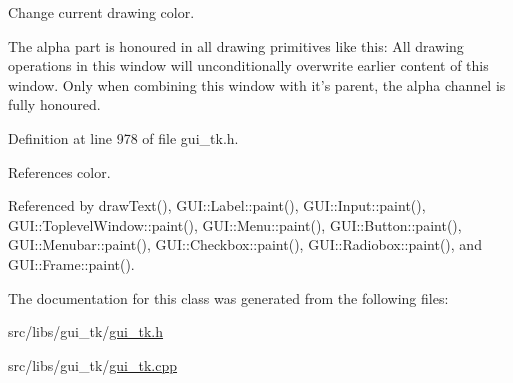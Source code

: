 Change current drawing color. 

The alpha part is honoured in all drawing primitives like this\-: All drawing operations in this window will unconditionally overwrite earlier content of this window. Only when combining this window with it's parent, the alpha channel is fully honoured. 

Definition at line 978 of file gui\-\_\-tk.\-h.



References color.



Referenced by draw\-Text(), G\-U\-I\-::\-Label\-::paint(), G\-U\-I\-::\-Input\-::paint(), G\-U\-I\-::\-Toplevel\-Window\-::paint(), G\-U\-I\-::\-Menu\-::paint(), G\-U\-I\-::\-Button\-::paint(), G\-U\-I\-::\-Menubar\-::paint(), G\-U\-I\-::\-Checkbox\-::paint(), G\-U\-I\-::\-Radiobox\-::paint(), and G\-U\-I\-::\-Frame\-::paint().



The documentation for this class was generated from the following files\-:\begin{DoxyCompactItemize}
\item 
src/libs/gui\-\_\-tk/\hyperlink{gui__tk_8h}{gui\-\_\-tk.\-h}\item 
src/libs/gui\-\_\-tk/\hyperlink{gui__tk_8cpp}{gui\-\_\-tk.\-cpp}\end{DoxyCompactItemize}
